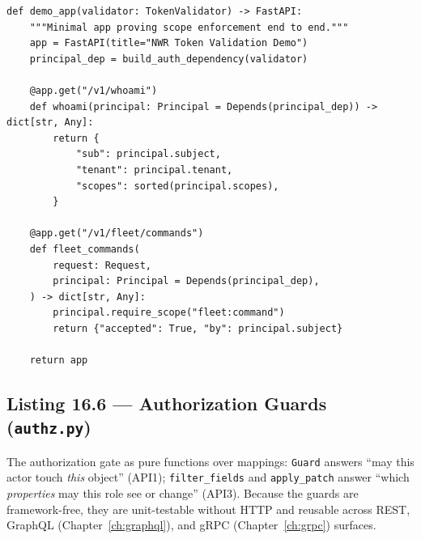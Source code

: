 \begin{verbatim}
def demo_app(validator: TokenValidator) -> FastAPI:
    """Minimal app proving scope enforcement end to end."""
    app = FastAPI(title="NWR Token Validation Demo")
    principal_dep = build_auth_dependency(validator)

    @app.get("/v1/whoami")
    def whoami(principal: Principal = Depends(principal_dep)) -> dict[str, Any]:
        return {
            "sub": principal.subject,
            "tenant": principal.tenant,
            "scopes": sorted(principal.scopes),
        }

    @app.get("/v1/fleet/commands")
    def fleet_commands(
        request: Request,
        principal: Principal = Depends(principal_dep),
    ) -> dict[str, Any]:
        principal.require_scope("fleet:command")
        return {"accepted": True, "by": principal.subject}

    return app
\end{verbatim}

\subsection{Listing 16.6 --- Authorization Guards (\texttt{authz.py})}
\label{lst:ch16-authz}

The authorization gate as pure functions over mappings: \texttt{Guard}
answers ``may this actor touch \emph{this} object'' (API1);
\texttt{filter\_fields} and \texttt{apply\_patch} answer ``which
\emph{properties} may this role see or change'' (API3). Because the guards
are framework-free, they are unit-testable without HTTP and reusable across
REST, GraphQL (Chapter~\ref{ch:graphql}), and gRPC
(Chapter~\ref{ch:grpc}) surfaces.

